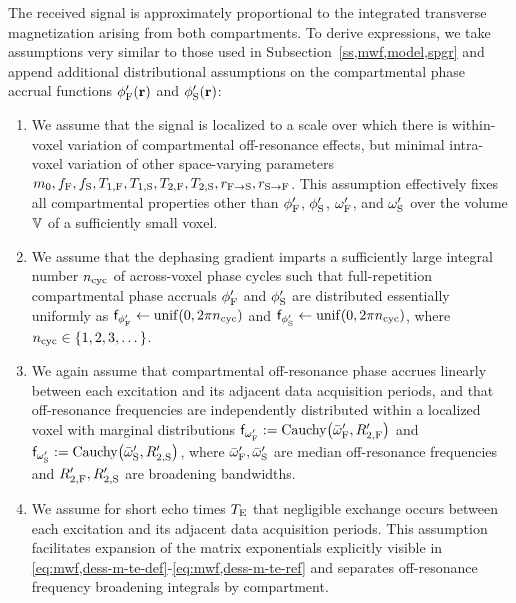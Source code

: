 The received signal is approximately proportional
to the integrated transverse magnetization
arising from both compartments.
To derive expressions,
we take assumptions very similar 
to those used in Subsection~\ref{ss,mwf,model,spgr}
and append additional distributional assumptions
on the compartmental phase accrual functions 
$\phipf\pr$ and $\phips\pr$:
\begin{enumerate}
	\item We assume that the signal is localized
		to a scale over which there is within-voxel variation
		of compartmental off-resonance effects, 
		but minimal intra-voxel variation 
		of other space-varying parameters
		$m_0, f_{\mathrm{F}}, f_{\mathrm{S}}, T_{1,\mathrm{F}}, T_{1,\mathrm{S}}, T_{2,\mathrm{F}}, T_{2,\mathrm{S}}, r_{\mathrm{F}\to\mathrm{S}}, r_{\mathrm{S}\to\mathrm{F}}$.
		This assumption effectively fixes all compartmental properties
		other than $\phi'_{\mathrm{F}}$, $\phi'_{\mathrm{S}}$, $\omega'_{\mathrm{F}}$, and $\omega'_{\mathrm{S}}$
		over the volume $\mathbb{V}$ 
		of a sufficiently small voxel.
		\label{item:dess,int} 
		
	\item
		We assume 
		that the dephasing gradient imparts 
		a sufficiently large integral number $n_\mathrm{cyc}$ 
		of across-voxel phase cycles
		such that full-repetition compartmental phase accruals
		$\phi'_{\mathrm{F}}$ and $\phi'_{\mathrm{S}}$ 
		are distributed essentially uniformly
		as $\dist{\phipf} \gets \unif{0,2\pi\cyc}$ 
		and $\dist{\phips} \gets \unif{0,2\pi\cyc}$, 
		where $\cyc \in \set{1,2,3,\dots}$.
		\label{item:dess,ph}
		
	\item 
		We again assume
		that compartmental off-resonance phase accrues linearly
		between each excitation 
		and its adjacent data acquisition periods,
		and that off-resonance frequencies
		are independently distributed 
		within a localized voxel 
		with marginal distributions
		$\dist{\ompf} := \operatorname{Cauchy}\paren{\ompfmed,\Rtpf}$
		and $\dist{\omps} := \operatorname{Cauchy}\paren{\ompsmed,\Rtps}$,
		where $\bar{\omega}_{\mathrm{F}}',\bar{\omega}_{\mathrm{S}}'$ are median off-resonance frequencies
		and $R_{2,\mathrm{F}}',R_{2,\mathrm{S}}'$ are broadening bandwidths.
		\label{item:dess,freq}
		
	\item 
		We assume 
		for short echo times $T_\mathrm{E}$
		that negligible exchange occurs
		between each excitation 
		and its adjacent data acquisition periods.
		This assumption facilitates expansion 
		of the matrix exponentials
		explicitly visible 
		in \eqref{eq:mwf,dess-m-te-def}-\eqref{eq:mwf,dess-m-te-ref}
		and separates off-resonance frequency broadening integrals
		by compartment.
		\label{item:dess,exchg0}
\end{enumerate}
